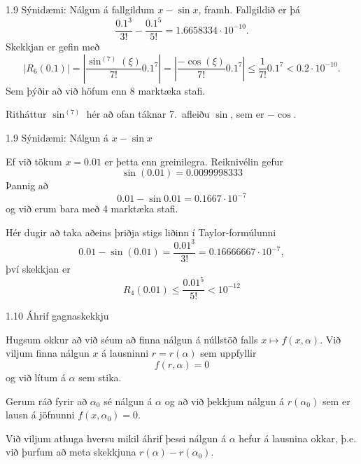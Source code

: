 \begin{frame}{1.9 Sýnidæmi: Nálgun á fallgildum $x-\sin x$, framh.}
Fallgildið er þá 
$$
\frac {0.1^3}{3!} - \frac{0.1^5}{5!} = 1.6658334 \cdot 10^{-10}.
$$
\pause
Skekkjan er gefin með
$$
    |R_6(0.1)| = \left|\frac{\sin^{(7)}(\xi)}{7!}0.1^7\right|
    = \left|\frac{-\cos(\xi)}{7!}0.1^7\right| 
    \leq \frac{1}{7!}0.1^7 < 0.2\cdot 10^{-10}.
$$
Sem þýðir að við höfum enn 8 marktæka stafi.

\begin{block}{Ritháttur}
 $\sin^{(7)}$ hér að ofan táknar 7.~afleiðu $\sin$, sem er $-\cos$.
\end{block}
\end{frame}
%
\begin{frame}{1.9 Sýnidæmi: Nálgun á $x-\sin x$} 

Ef við tökum $x = 0.01$ er þetta enn greinilegra. 
Reiknivélin gefur
$$
    \sin(0.01) = 0.0099998333
$$
Þannig að 
$$
    0.01 - \sin 0.01 = 0.1667\cdot 10^{-7}
$$
og við erum bara með 4 marktæka stafi.
\pause

Hér dugir að taka aðeins þriðja stigs liðinn í Taylor-formúlunni
\begin{equation*}
    0.01 - \sin (0.01) = \frac{0.01^3}{3!} 
    = 0.16666667 \cdot 10^{-7},
\end{equation*}
því skekkjan er
$$
R_4(0.01) \leq \frac{0.01^5}{5!} < 10^{-12}
$$
\end{frame}
%



%
\begin{frame}{1.10 Áhrif gagnaskekkju} 

\begin{block}{}
Hugsum okkur að við séum að finna nálgun á núllstöð falls $x\mapsto f(x,\alpha)$.
 Við viljum finna nálgun $x$ á lausninni $r=r(\alpha)$ sem uppfyllir 
\begin{equation*}
    f(r,\alpha) = 0
\end{equation*}
og við lítum á $\alpha$ sem stika. 
\end{block}

\pause
\begin{block}{}
Gerum ráð fyrir að $\alpha_0$ sé
nálgun á $\alpha$ og að við þekkjum nálgun á $r(\alpha_0)$ sem er
lausn á jöfnunni $f(x,\alpha_0)=0$. 
\end{block}

\pause
\begin{block}{}
Við viljum athuga hversu mikil áhrif þessi nálgun á $\alpha$ hefur
á lausnina okkar, þ.e. við þurfum að meta skekkjuna
$r(\alpha)-r(\alpha_0)$. 
\end{block}
\end{frame}

